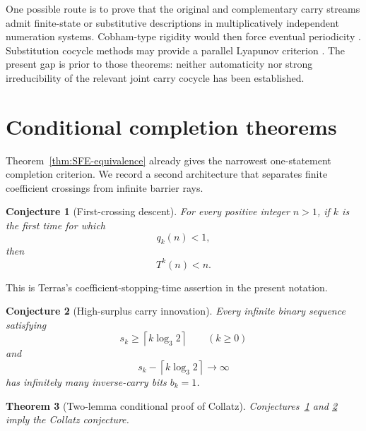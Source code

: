 \documentclass[11pt,reqno]{amsart}
\numberwithin{equation}{section}
\newtheorem{theorem}{Theorem}[section]
\newtheorem{conjecture}[theorem]{Conjecture}
\theoremstyle{definition}
\theoremstyle{remark}
\newcommand{\ceil}[1]{\left\lceil #1\right\rceil}
\begin{document}
One possible route is to prove that the original and complementary carry
streams admit finite-state or substitutive descriptions in multiplicatively
independent numeration systems.  Cobham-type rigidity would then force
eventual periodicity \cite{BustosFokkinkYassawi2025}.  Substitution cocycle
methods may provide a parallel Lyapunov criterion \cite{Solomyak2025}.  The
present gap is prior to those theorems: neither automaticity nor strong
irreducibility of the relevant joint carry cocycle has been established.

\section{Conditional completion theorems}\label{sec:completion}

Theorem~\ref{thm:SFE-equivalence} already gives the narrowest one-statement
completion criterion.  We record a second architecture that separates
finite coefficient crossings from infinite barrier rays.

\begin{conjecture}[First-crossing descent]\label{conj:FCD}
For every positive integer $n>1$, if $k$ is the first time for which
\[
q_k(n)<1,
\]
then
\begin{equation}\label{eq:FCD}
T^k(n)<n.
\end{equation}
\end{conjecture}

This is Terras's coefficient-stopping-time assertion in the present notation.

\begin{conjecture}[High-surplus carry innovation]\label{conj:HSCI}
Every infinite binary sequence satisfying
\begin{equation}\label{eq:HSCI-hyp}
s_k\ge\ceil{k\log_3 2}
\qquad(k\ge0)
\end{equation}
and
\begin{equation}\label{eq:HSCI-surplus}
s_k-\ceil{k\log_3 2}\longrightarrow\infty
\end{equation}
has infinitely many inverse-carry bits $b_k=1$.
\end{conjecture}

\begin{theorem}[Two-lemma conditional proof of Collatz]\label{thm:FCD-HSCI}
Conjectures~\ref{conj:FCD} and \ref{conj:HSCI} imply the Collatz conjecture.
\end{theorem}
\end{document}
